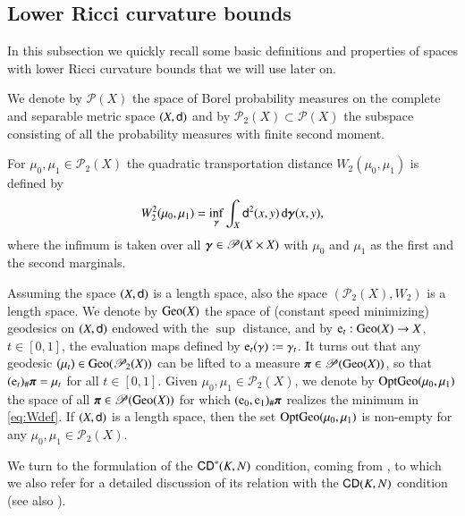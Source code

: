 \documentclass[11pt,reqno]{amsart}
\newcommand{\sfd}{{\sf d}}
\renewcommand{\d}{{\rm{d}}}
\newcommand{\Prob}{\mathscr P}
\newcommand{\geo}{{\rm{Geo}}}                       %
\newcommand{\e}{{\rm{e}}}                           %
\newcommand{\gopt}{{\rm{OptGeo}}}                   %
\newcommand{\ppi}{{\mbox{\boldmath$\pi$}}}
\newcommand{\ggamma}{{\mbox{\boldmath$\gamma$}}}
\newcommand{\sggamma}{{\mbox{\scriptsize\boldmath$\gamma$}}}
\newcommand{\CD}{{\sf CD}}
\theoremstyle{definition}
\theoremstyle{remark}
\theoremstyle{remark}
\theoremstyle{remark}
\theoremstyle{remark}
\theoremstyle{remark}
\theoremstyle{remark}
\theoremstyle{remark}
\begin{document}
\subsection{Lower Ricci curvature bounds}\label{SS:defRCD}
In this subsection  we quickly recall some basic definitions and properties of spaces with lower Ricci curvature bounds that we will use later on.


We denote by $\Prob(X)$ the space of Borel probability measures on the complete and separable metric space $(X,\sfd)$ and by $\Prob_2 (X) \subset \Prob (X)$ the subspace consisting of all the probability measures with finite second moment.

For $\mu_0,\mu_1 \in \Prob_2(X)$ the quadratic transportation distance $W_2(\mu_0,\mu_1)$ is defined by
\begin{equation}\label{eq:Wdef}
  W_2^2(\mu_0,\mu_1) = \inf_{\sggamma} \int_X \sfd^2(x,y) \,\d\ggamma(x,y),
\end{equation}
where the infimum is taken over all $\ggamma \in \Prob(X \times X)$ with $\mu_0$ and $\mu_1$ as the first and the second marginals.

Assuming the space $(X,\sfd)$ is a length space, also the space $(\Prob_2(X), W_2)$ is a length space. We denote  by $\geo(X)$ the space of (constant speed minimizing) geodesics on $(X,\sfd)$ endowed with the $\sup$ distance, and by $\e_t:\geo(X)\to X$, $t\in[0,1]$, the evaluation maps defined by $\e_t(\gamma):=\gamma_t$. It turns out that any geodesic $(\mu_t) \in \geo(\Prob_2(X))$ can be lifted to a measure $\ppi \in \Prob(\geo(X))$, so that $(\e_t)_\#\ppi = \mu_t$ for all $t \in [0,1]$. Given $\mu_0,\mu_1\in \Prob_2(X)$, we denote by $\gopt(\mu_0,\mu_1)$ the space of all
$\ppi \in \Prob(\geo(X))$ for which $(\e_0,\e_1)_\#\ppi$ realizes the minimum in \eqref{eq:Wdef}. If $(X,\sfd)$ is a length space, then the set $\gopt(\mu_0,\mu_1)$ is non-empty for any $\mu_0,\mu_1\in \Prob_2(X)$.

We turn to the formulation of the $\CD^*(K,N)$ condition, coming from  \cite{BS2010}, to which we also refer for a detailed discussion of its relation with the $\CD(K,N)$ condition
 (see also \cite{Cavalletti12}).
\end{document}
